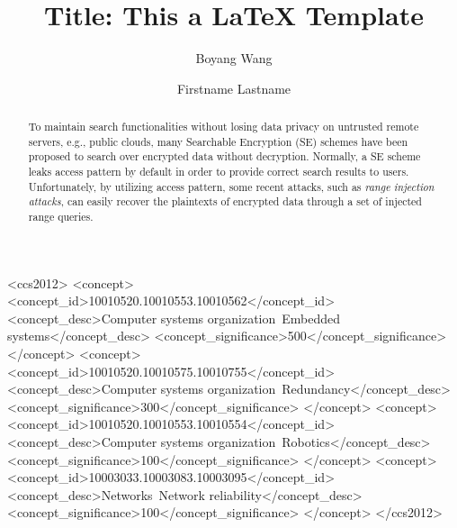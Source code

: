 \documentclass[sigconf]{acmart}
\begin{document}
\title{Title: This a LaTeX Template}


\author{Boyang Wang}

\author{Firstname Lastname}


\renewcommand{\shortauthors}{B. Wang et al.}


\begin{abstract}
To maintain search functionalities without losing data privacy on untrusted remote servers, e.g., public clouds, many Searchable Encryption (SE) schemes have been proposed to search over encrypted data without decryption. Normally, a SE scheme leaks access pattern by default in order to provide correct search results to users. Unfortunately, by utilizing access pattern, some recent attacks, such as \textit{range injection attacks}, can easily recover the plaintexts of encrypted data through a set of injected range queries. 
\end{abstract}

%
%
\begin{CCSXML}
<ccs2012>
 <concept>
  <concept_id>10010520.10010553.10010562</concept_id>
  <concept_desc>Computer systems organization~Embedded systems</concept_desc>
  <concept_significance>500</concept_significance>
 </concept>
 <concept>
  <concept_id>10010520.10010575.10010755</concept_id>
  <concept_desc>Computer systems organization~Redundancy</concept_desc>
  <concept_significance>300</concept_significance>
 </concept>
 <concept>
  <concept_id>10010520.10010553.10010554</concept_id>
  <concept_desc>Computer systems organization~Robotics</concept_desc>
  <concept_significance>100</concept_significance>
 </concept>
 <concept>
  <concept_id>10003033.10003083.10003095</concept_id>
  <concept_desc>Networks~Network reliability</concept_desc>
  <concept_significance>100</concept_significance>
 </concept>
</ccs2012>  
\end{CCSXML}
\end{document}
